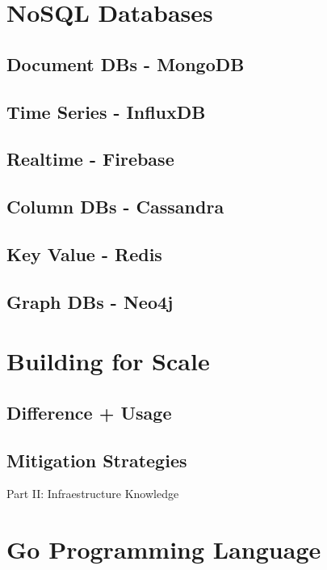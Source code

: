 \documentclass[a4paper]{article}
\begin{document}
    \newpage
    \section{NoSQL Databases}
    \subsection{Document DBs - MongoDB}
    \subsection{Time Series - InfluxDB}
    \subsection{Realtime - Firebase}
    \subsection{Column DBs - Cassandra}
    \subsection{Key Value - Redis}
    \subsection{Graph DBs - Neo4j}

    \newpage
    \section{Building for Scale}
    \subsection{Difference + Usage}
    \subsection{Mitigation Strategies}


    \newpage

    \thispagestyle{empty} %
    \vspace*{\fill}
    \begin{center}
        \Huge Part II: Infraestructure Knowledge
    \end{center}
    \vspace*{\fill}
    \newpage


    \section{Go Programming Language}
\end{document}
